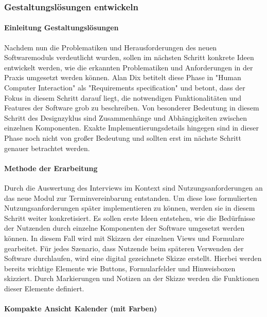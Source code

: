 \documentclass[12pt]{article}
\begin{document}
\subsubsection{Gestaltungslösungen entwickeln}

\paragraph{Einleitung Gestaltungslösungen}
Nachdem nun die Problematiken und Herausforderungen des neuen Softwaremoduls
verdeutlicht wurden, sollen im nächsten Schritt konkrete Ideen entwickelt
werden, wie die erkannten Problematiken und Anforderungen in der Praxis
umgesetzt werden können. Alan Dix betitelt diese Phase in "Human Computer
Interaction" als "Requirements specification" und betont, dass der Fokus in
diesem Schritt darauf liegt, die notwendigen Funktionalitäten und Features der
Software grob zu beschreiben. Von besonderer Bedeutung in diesem Schritt des
Designzyklus sind Zusammenhänge und Abhängigkeiten zwischen einzelnen
Komponenten. Exakte Implementierungsdetails hingegen sind in dieser Phase noch
nicht von großer Bedeutung und sollten erst im nächste Schritt genauer
betrachtet werden.

\paragraph{Methode der Erarbeitung}
Durch die Auswertung des Interviews im Kontext sind Nutzungsanforderungen an
das neue Modul zur Terminvereinbarung entstanden. Um diese lose formulierten
Nutzungsanforderungen später implementieren zu können, werden sie in diesem
Schritt weiter konkretisiert. Es sollen erste Ideen entstehen, wie die
Bedürfnisse der Nutzenden durch einzelne Komponenten der Software umgesetzt
werden können. In diesem Fall wird mit Skizzen der einzelnen Views und
Formulare gearbeitet. Für jedes Szenario, dass Nutzende beim späteren Verwenden
der Software durchlaufen, wird eine digital gezeichnete Skizze erstellt.
Hierbei werden bereits wichtige Elemente wie Buttons, Formularfelder und
Hinweisboxen skizziert. Durch Markierungen und Notizen an der Skizze werden die
Funktionen dieser Elemente definiert.

\paragraph{Kompakte Ansicht Kalender (mit Farben)}
\end{document}
